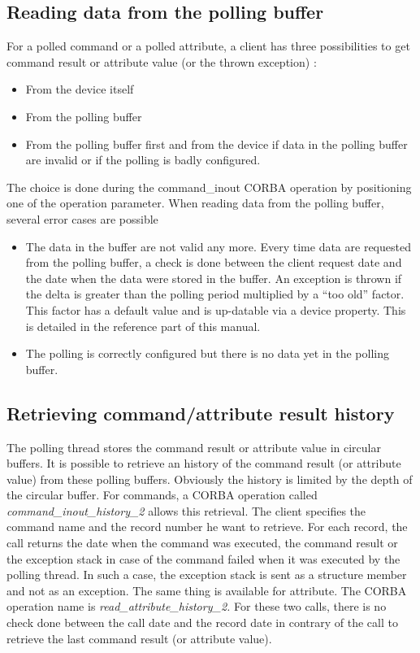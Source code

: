\subsection{Reading data from the polling buffer}

For a polled command or a polled attribute, a client has three possibilities
to get command result or attribute value (or the thrown exception)
:
\begin{itemize}
\item From the device itself
\item From the polling buffer
\item From the polling buffer first and from the device if data in the polling
buffer are invalid or if the polling is badly configured.
\end{itemize}
The choice is done during the command\_inout CORBA operation by positioning
one of the operation parameter. When reading data from the polling
buffer, several error cases are possible 
\begin{itemize}
\item The data in the buffer are not valid any more. Every time data are
requested from the polling buffer, a check is done between the client
request date and the date when the data were stored in the buffer.
An exception is thrown if the delta is greater than the polling period
multiplied by a ``too old'' factor. This factor has a default value
and is up-datable via a device property. This is detailed in the reference
part of this manual.
\item The polling is correctly configured but there is no data yet in the
polling buffer.
\end{itemize}

\subsection{Retrieving command/attribute result history}

The polling thread stores the command result or attribute value in
circular buffers. It is possible to retrieve an history of the command
result (or attribute value) from these polling buffers. Obviously
the history is limited by the depth of the circular buffer. For commands,
a CORBA operation called \emph{command\_inout\_history\_2}
allows this retrieval. The client specifies the command name and the
record number he want to retrieve. For each record, the call returns
the date when the command was executed, the command result or the
exception stack in case of the command failed when it was executed
by the polling thread. In such a case, the exception stack is sent
as a structure member and not as an exception. The same thing is available
for attribute. The CORBA operation name is \emph{read\_attribute\_history\_2.}
For these two calls, there is no check done between the call date
and the record date in contrary of the call to retrieve the last command
result (or attribute value).


